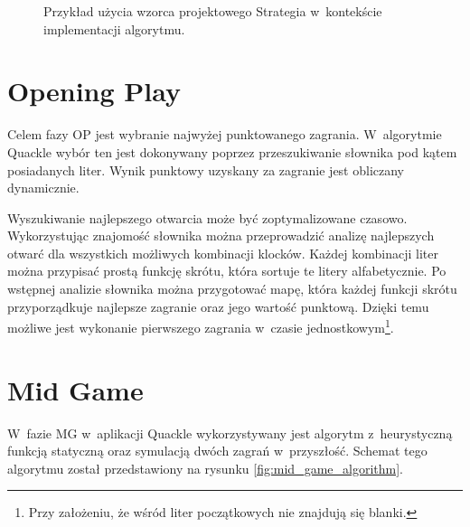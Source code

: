 \documentclass[a4paper,twocolumn,12pt]{article}
\theoremstyle{definition}
\begin{document}
\begin{figure}[ht!]
	\centering
	\caption{Przykład użycia wzorca projektowego Strategia w~kontekście implementacji algorytmu.}
	\label{fig:strategy_pattern}
\end{figure}

\section*{Opening Play}

Celem fazy OP jest wybranie najwyżej punktowanego zagrania. W~algorytmie Quackle wybór ten jest dokonywany poprzez przeszukiwanie słownika pod kątem posiadanych liter. Wynik punktowy uzyskany za zagranie jest obliczany dynamicznie. 

Wyszukiwanie najlepszego otwarcia może być zoptymalizowane czasowo. Wykorzystując znajomość słownika można przeprowadzić analizę najlepszych otwarć dla wszystkich możliwych kombinacji klocków. Każdej kombinacji liter można przypisać prostą funkcję skrótu, która sortuje te litery alfabetycznie. Po wstępnej analizie słownika można przygotować mapę, która każdej funkcji skrótu przyporządkuje najlepsze zagranie oraz jego wartość punktową. Dzięki temu możliwe jest wykonanie pierwszego zagrania w~czasie jednostkowym\footnote{Przy założeniu, że wśród liter początkowych nie znajdują się blanki.}.

\section*{Mid Game}

W~fazie MG w~aplikacji Quackle wykorzystywany jest algorytm z~heurystyczną funkcją statyczną oraz symulacją dwóch zagrań w~przyszłość. Schemat tego algorytmu został przedstawiony na rysunku \ref{fig:mid_game_algorithm}.~\cite{quackle_algorithm}
\end{document}
